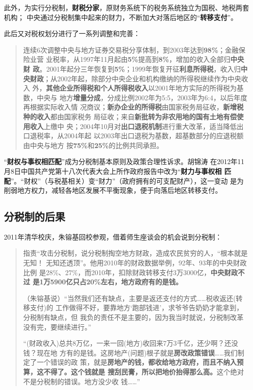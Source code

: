此外，为实行分税制，\textbf{财税分家}，原财务系统下的税务系统独立为国税、地税两套机构；
中央通过分税制集中起来的财力，不断加大对落后地区的“\textbf{转移支付}”。

此后又对税权划分进行了一系列调整和完善：
\begin{quotation}
  连续6次调整中央与地方证券交易税分享体制，到2003年达到\textbf{98\%}；金融保险业营
  业税率，从1997年11月起由\textbf{5\%}提高到\textbf{8\%}，增加的收入全部归\textbf{中央财
    政}。2001年起分三年恢复到\textbf{5\%}；1999年恢复开征\textbf{利息所得税}，收入归\textbf{中
    央财政}；从2002年起，除部分中央企业和机构缴纳的所得税继续作为中央收入
  外，\textbf{其他企业所得税和个人所得税收入}以2001年地方实际的所得税为基数，中央与
  地方\textbf{增量分成}，分成比例2002年为5:5，2003年为6:4，以后年度再根据实际收入情
  况商议；\textbf{新办企业的所得税}由国家税务局征收，\textbf{新增税种的收入}都由国家税务
  局征收；来自\textbf{新批转为非农用地的国有土地有偿使用收入}上缴中
  央；2004年10月对\textbf{出口退税机制}进行重大改革，适当降低出口退税率，从2004年起
  以2003年出口退税为基数，超基数部分的应退税额由中央与地方
  按\textbf{75\%}和\textbf{25\%}的比例共同承担。\cite{eryuancaizheng}
\end{quotation}

“\textbf{财权与事权相匹配}”成为分税制基本原则及政策合理性诉求。胡锦涛
在2012年11月8日中国共产党第十八次代表大会上所作政府报告中改为“\textbf{财力与事权相
  匹配}”。“财权”（与税基相关）变“财力”（政府拥有的可支配财产），这一变动
是为削弱地方权力，减轻各地区发展不平衡现象，便于向落后地区转移支付。

\subsection{分税制的后果}


2011年清华校庆，朱镕基回校参观，借着师生座谈会的机会说到分税制：
\begin{quotation}
  指责“攻击分税制，说分税制掏空地方财政，造成农民贫穷的人，“根本就是无知！
  无知还透顶”。他用2010年的财政数据举例，92年、93年的中央财政比例
  是28\%、27\%，而2010年，扣除财政转移支付3万3000亿，\textbf{中央财政不过
    是1万5900亿只占20\%左右，地方政府有的是钱。}

  （朱镕基说）“当然我们还有缺点，主要是返还支付的方式……税收返还(转移支付)的
  工作做得不好，要靠地方‘跑部钱进’，求爷爷告奶奶才能拿到，分税制有缺点，但
  我负的责任不是主要的，因为我当时就说，分税制改革没有完，要继续进行。”

  “(财政收入)总共8万亿，一来一回(地方)收回来7万3千亿，还少啊？还没钱？现在地
  方有的是钱。这房地产(问题)根子就是\textbf{房改政策错误}……我们制定了一个错误的政
  策，就是\textbf{房地产的钱，都收给地方政府，而且不纳入预算，这不得了。这个钱就是
    搜刮民膏，所以把地价抬得那么高。}这个绝对不是分税制的错误。地方没少收
  钱……”
\end{quotation}

